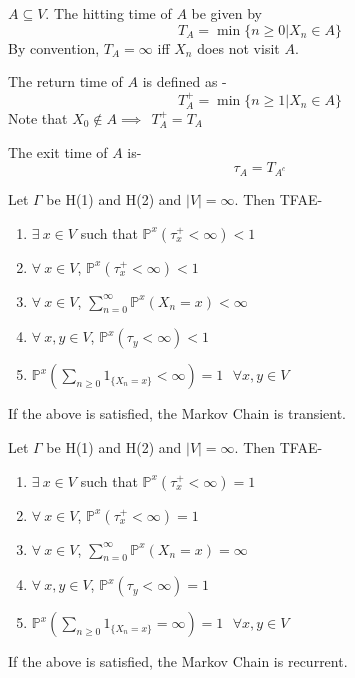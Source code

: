 \documentclass[main]{subfiles}
\begin{document}
\begin{definition} $A \subseteq V$. The hitting time of $A$ be given by
  $$T_A= \min\{n \geq 0 |X_n \in A\}$$
  By convention, $T_A =\infty$ iff $X_n$ does not visit $A$. \end{definition}
\begin{definition}
  The return time of $A$ is defined as -
  $$T_A^{+}= \min\{n \geq 1 | X_n \in A\}$$
  Note that $X_0 \notin A \implies ~~ T_A^{+}= T_A$ \end{definition}
\begin{definition}
  The exit time of $A$ is-
  $$\tau_{A}= T_{A^c}$$ \end{definition}
\begin{theorem} Let $\Gamma$ be H(1) and H(2) and $|V|=\infty$. Then TFAE-
  \begin{enumerate}
    \item $\exists~ x \in V$ such that $\mathbb{P}^x(\tau_x^{+} <\infty) <1$ \\
    \item $\forall~ x \in V$, $\mathbb{P}^x(\tau_x^{+} < \infty) <1$ \\
    \item $\forall~ x \in V$, $\sum_{n=0}^{\infty} \mathbb{P}^x (X_n=x) < \infty$ \\
    \item $\forall~ x,y \in V$, $\mathbb{P}^x (\tau_y < \infty) <1$ \\
    \item $\mathbb{P}^x (\sum_{n \geq 0} 1_{\{X_n=x\}} < \infty) =1 ~~~ \forall x,y \in V$
  \end{enumerate}
  If the above is satisfied, the Markov Chain is transient.
\end{theorem}
\begin{theorem} Let $\Gamma$ be H(1) and H(2) and $|V|=\infty$. Then TFAE-
  \begin{enumerate}
    \item $\exists~ x \in V$ such that $\mathbb{P}^x(\tau_x^{+} <\infty) =1$ \\
    \item $\forall~ x \in V$, $\mathbb{P}^x(\tau_x^{+} < \infty) =1$ \\
    \item $\forall~ x \in V$, $\sum_{n=0}^{\infty} \mathbb{P}^x (X_n=x) = \infty$ \\
    \item $\forall~ x,y \in V$, $\mathbb{P}^x (\tau_y < \infty) =1$ \\
    \item $\mathbb{P}^x (\sum_{n \geq 0} 1_{\{X_n=x\}} = \infty) =1 ~~~ \forall x,y \in V$
  \end{enumerate}
  If the above is satisfied, the Markov Chain is recurrent. \end{theorem}
\end{document}
